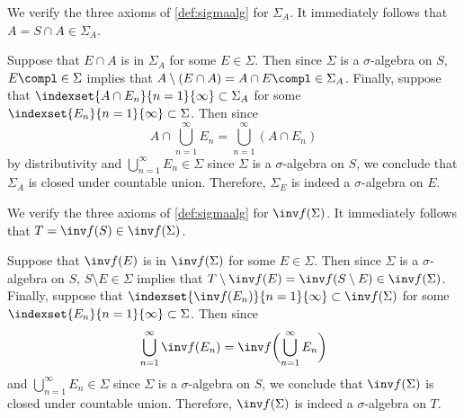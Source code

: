 \begin{myproof}
    \begin{alist}
        \item We verify the three axioms of \cref{def:sigmaalg}
        for \(\Sigma_A\).
        It immediately follows that \(A=S\cap A\in\Sigma_A\).
        
        Suppose that
        \(E\cap A\) is in \(\Sigma_A\) for some \(E\in\Sigma\).
        Then since \(\Sigma\) is a \(\sigma\)-algebra on \(S\),
        \(E\compl\in\Sigma\) implies that
        \(A\setminus(E\cap A)=A\cap E\compl\in\Sigma_A\).
        Finally, suppose that
        \(\indexset{A\cap E_n}{n=1}{\infty}\subset\Sigma_A\)
        for some \(\indexset{E_n}{n=1}{\infty}\subset\Sigma\).
        Then since
        \[
            A\cap\bigcup_{n=1}^\infty E_n
            =\bigcup_{n=1}^\infty(A\cap E_n)
        \]
        by distributivity
        and \(\bigcup_{n=1}^\infty E_n\in\Sigma\)
        since \(\Sigma\) is a \(\sigma\)-algebra on \(S\),
        we conclude that
        \(\Sigma_A\) is closed under countable union.
        Therefore, \(\Sigma_E\) is indeed a \(\sigma\)-algebra on \(E\).
        
        \item We verify the three axioms of \cref{def:sigmaalg}
        for \(\inv f(\Sigma)\).
        It immediately follows that \(T=\inv f(S)\in\inv f(\Sigma)\).
        
        Suppose that
        \(\inv f(E)\) is in \(\inv f(\Sigma)\) for some \(E\in\Sigma\).
        Then since \(\Sigma\) is a \(\sigma\)-algebra on \(S\),
        \(S\setminus E\in\Sigma\) implies that
        \(T\setminus\inv f(E)=\inv f(S\setminus E)\in\inv f(\Sigma)\).
        Finally, suppose that
        \(\indexset{\inv f(E_n)}{n=1}{\infty}\subset\inv f(\Sigma)\)
        for some \(\indexset{E_n}{n=1}{\infty}\subset\Sigma\).
        Then since
        \[
            \bigcup_{n=1}^\infty\inv f(E_n)
            =\inv f\biggl(\bigcup_{n=1}^\infty E_n\biggr)
        \]
        and \(\bigcup_{n=1}^\infty E_n\in\Sigma\)
        since \(\Sigma\) is a \(\sigma\)-algebra on \(S\),
        we conclude that
        \(\inv f(\Sigma)\) is closed under countable union.
        Therefore,
        \(\inv f(\Sigma)\) is indeed a \(\sigma\)-algebra on \(T\).
        \rightqed
    \end{alist}
\end{myproof}

